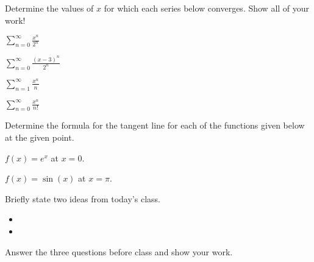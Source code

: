 \begin{problem}
\clearpage

\item Determine the values of $x$ for which each series
  below converges. Show all of your work!  
  \begin{subproblem}
    \item $\displaystyle \sum_{n=0}^\infty \frac{x^n}{2^n}$
      \vfill
    \item $\displaystyle \sum_{n=0}^\infty \frac{(x-3)^n}{2^n}$
      \vfill
      \clearpage
    \item $\displaystyle \sum_{n=1}^\infty \frac{x^n}{n} $
      \vfill
    \item $\displaystyle \sum_{n=0}^\infty \frac{x^n}{n!} $
      \vfill
  \end{subproblem}
  \clearpage
  \item Determine the formula for the tangent line for each of the functions given below at the given point.
  \begin{subproblem}
    \item $\displaystyle f(x)=e^x$ at $x=0$.
    \vfill
    \item $\displaystyle f(x)=\sin(x)$ at $x=\pi$.
    \vfill
  \end{subproblem}
\end{problem}


\postClass

\begin{problem}
\item Briefly state two ideas from today's class.
  \begin{itemize}
  \item
  \item
  \end{itemize}
\item
  \begin{subproblem}
    \item
  \end{subproblem}
\end{problem}



Answer the three questions before class and show your work.

